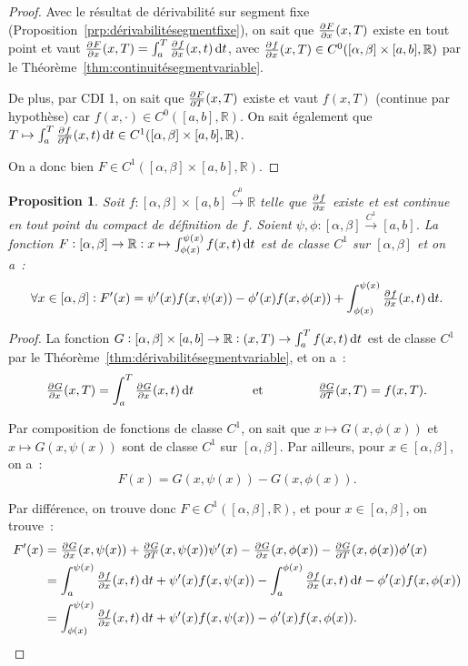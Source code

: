 \documentclass{report}
\newtheorem{prp}[thm]{Proposition}
\theoremstyle{definition}
\theoremstyle{remark}
\numberwithin{equation}{section}
\newcommand{\R}{\mathbb R}
\newcommand{\toC}[1]{\xrightarrow{C^{#1}}}
\newcommand{\tocont}{\toC 0}
\newcommand{\CDII}{{CDI 1}}
\begin{document}
			\begin{proof} Avec le résultat de dérivabilité sur segment fixe (Proposition~\ref{prp:dérivabilitésegmentfixe}), on sait que $\pd Fx(x, T)$ existe
			en tout point et vaut $\pd Fx(x, T) = \int_a^T\pd fx(x, t)\dif t$, avec $\pd fx(x, T) \in C^0([\alpha, \beta] \times [a, b], \R)$ par le
			Théorème~\ref{thm:continuitésegmentvariable}.

			De plus, par \CDII, on sait que $\pd FT(x, T)$ existe et vaut $f(x, T)$ (continue par hypothèse) car $f(x, \cdot) \in C^0([a, b], \R)$. On sait
			également que $T \mapsto \int_a^T \pd fT(x, t)\dif t \in C^1([\alpha, \beta] \times [a, b], \R)$.

			On a donc bien $F \in C^1([\alpha, \beta] \times [a, b], \R)$.
			\end{proof}

			\begin{prp} Soit $f : [\alpha, \beta] \times [a, b] \tocont \R$ telle que $\pd fx$ existe et est continue en tout point du compact de définition de
			$f$. Soient $\psi, \phi : [\alpha, \beta] \toC1 [a, b]$. La fonction $F : [\alpha, \beta] \to \R : x \mapsto \int_{\phi(x)}^{\psi(x)}f(x, t)\dif t$
			est de classe $C^1$ sur $[\alpha, \beta]$ et on a~:
			\begin{equation}
				\forall x \in [\alpha, \beta] : F'(x) = \psi'(x)f(x, \psi(x)) - \phi'(x)f(x, \phi(x)) + \int_{\phi(x)}^{\psi(x)}\pd fx(x, t)\dif t.
			\end{equation}
			\end{prp}

			\begin{proof} La fonction $G : [\alpha, \beta] \times [a, b] \to \R : (x, T) \to \int_a^Tf(x, t)\dif t$ est de classe $C^1$ par le
			Théorème~\ref{thm:dérivabilitésegmentvariable}, et on a~:
			\begin{equation}
				\pd Gx(x, T) = \int_a^T\pd Gx(x, t)\dif t\ \qquad\qquad\text{ et }\qquad\qquad \pd GT(x, T) = f(x, T).
			\end{equation}

			Par composition de fonctions de classe $C^1$, on sait que $x \mapsto G(x, \phi(x))$ et $x \mapsto G(x, \psi(x))$ sont de classe $C^1$ sur
			$[\alpha, \beta]$. Par ailleurs, pour $x \in [\alpha, \beta]$, on a~:
			\begin{equation}
				F(x) = G(x, \psi(x)) - G(x, \phi(x)).
			\end{equation}

			Par différence, on trouve donc $F \in C^1([\alpha, \beta], \R)$, et pour $x \in [\alpha, \beta]$, on trouve~:
			\begin{align}
				F'(x) &= \pd Gx(x, \psi(x)) + \pd GT(x, \psi(x))\psi'(x) - \pd Gx(x, \phi(x)) - \pd GT(x, \phi(x))\phi'(x) \\
				&= \int_a^{\psi(x)}\pd fx(x, t)\dif t + \psi'(x)f(x, \psi(x)) - \int_a^{\phi(x)}\pd fx(x, t)\dif t - \phi'(x)f(x, \phi(x)) \\
				&= \int_{\phi(x)}^{\psi(x)}\pd fx(x, t)\dif t + \psi'(x)f(x, \psi(x)) - \phi'(x)f(x, \phi(x)).
			\end{align}
			\end{proof}
\end{document}
